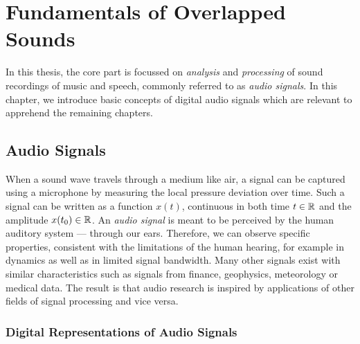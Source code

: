 \hypertarget{Fundamentals of Overlapped Sounds}{%
\chapter{Fundamentals of Overlapped Sounds}\label{cha:fundamentals}}

In this thesis, the core part is focussed on \emph{analysis} and \emph{processing} of sound recordings of music and speech, commonly referred to as \emph{audio signals}.
In this chapter, we introduce basic concepts of digital audio signals which are relevant to apprehend the remaining chapters.

\hypertarget{Audio Signals}{%
\section{Audio Signals}\label{sec:specifics-of-audio-signals}}

When a sound wave travels through a medium like air, a signal can be captured using a microphone by measuring the local pressure deviation over time.
Such a signal can be written as a function \(x(t)\), continuous in both time \(t \in {\mathbb{R}}\) and the amplitude \(x(t_0) \in {\mathbb{R}}\).
An \emph{audio signal} is meant to be perceived by the human auditory system --- through our ears.
Therefore, we can observe specific properties, consistent with the limitations of the human hearing, for example in dynamics as well as in limited signal bandwidth.
Many other signals exist with similar characteristics such as signals from finance, geophysics, meteorology or medical data.
The result is that audio research is inspired by applications of other fields of signal processing and vice versa.

\hypertarget{digital-representations-of-audio-signals}{%
\subsection{Digital Representations of Audio
Signals}\label{digital-representations-of-audio-signals}}

